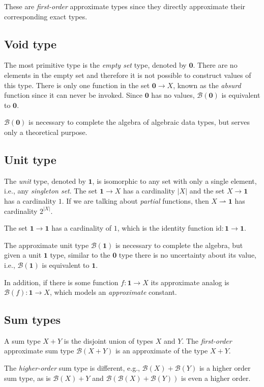 \documentclass[11pt,final,hidelinks]{article}
\newcommand{\Void}{\mathbf{0}}     %
\newcommand{\Unit}{\mathbf{1}}     %
\newcommand{\id}{\mathrm{id}}      %
\newcommand{\Ber}[1]{\mathcal{B}(#1)}  %
\theoremstyle{plain}
\begin{document}
These are \emph{first-order} approximate types since they directly approximate their corresponding exact types.

\subsection{Void type}
The most primitive type is the \emph{empty set} type, denoted by $\Void$.
There are no elements in the empty set and therefore it is not possible to construct values of this type.
There is only one function in the set $\Void \to X$, known as the \emph{absurd} function since it can never be invoked.
Since $\Void$ has no values, $\Ber{\Void}$ is equivalent to $\Void$.

$\Ber{\Void}$ is necessary to complete the algebra of algebraic data types, but serves only a theoretical purpose.

\subsection{Unit type}
The \emph{unit} type, denoted by $\Unit$, is isomorphic to any set with only a single element, i.e., any \emph{singleton set}.
The set $\Unit \to X$ has a cardinality $|X|$ and the set $X \to \Unit$ has a cardinality $1$.
If we are talking about \emph{partial} functions, then $X \rightharpoonup \Unit$ has cardinality $2^{|X|}$.

The set $\Unit \to \Unit$ has a cardinality of $1$, which is the identity function $\id : \Unit \to \Unit$.

The approximate unit type $\Ber{\Unit}$ is necessary to complete the algebra, but given a unit $\Unit$ type, similar to the $\Void$ type there is no uncertainty about its value, i.e., $\Ber{\Unit}$ is equivalent to $\Unit$.

In addition, if there is some function $f : \Unit \to X$ its approximate analog is $\Ber{f} : \Unit \to X$, which models an \emph{approximate} constant.

\subsection{Sum types}

A sum type $X + Y$ is the disjoint union of types $X$ and $Y$.
The \emph{first-order} approximate sum type $\Ber{X + Y}$ is an approximate of the type $X+Y$.

The \emph{higher-order} sum type is different, e.g., $\Ber{X} + \Ber{Y}$ is a higher order sum type, as is $\Ber{X} + Y$ and $\Ber{\Ber{X} + \Ber{Y}}$ is even a higher order.
\end{document}
